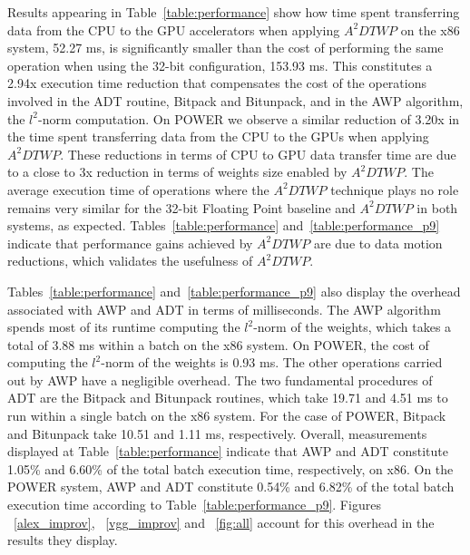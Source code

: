 Results appearing in Table~\ref{table:performance} show how time spent 
transferring data from the CPU to the GPU accelerators when applying $A^2DTWP$ 
on the x86 system, 52.27 ms, is significantly smaller than the cost of 
performing the same operation when using the 32-bit configuration, 153.93 ms.  
This constitutes a 2.94x execution time reduction that compensates the cost of 
the operations involved in the ADT routine, Bitpack and
Bitunpack, and in the AWP algorithm, the $l^2$-norm computation.
On POWER we observe a similar reduction of 3.20x in the time spent transferring
data from the CPU to the GPUs when applying $A^2DTWP$.
These reductions in terms of CPU to GPU data transfer time are due to a close to 
3x reduction in terms of weights size enabled by $A^2DTWP$.
The average execution time of operations where the $A^2DTWP$ technique plays no 
role remains very similar for the 32-bit Floating Point baseline and $A^2DTWP$ 
in both systems, as expected.
Tables~\ref{table:performance} and~\ref{table:performance_p9} indicate that 
performance gains achieved by $A^2DTWP$ are due to data motion reductions, which 
validates the usefulness of $A^2DTWP$.

Tables~\ref{table:performance} and~\ref{table:performance_p9} also display the 
overhead associated with AWP and ADT in terms of milliseconds.
The AWP algorithm spends most of its runtime computing the $l^2$-norm of the 
weights, which takes a total of 3.88 ms within a batch on the x86 system.  On 
POWER, the cost of computing the $l^2$-norm of the weights is 0.93 ms.
The other operations carried out by AWP have a negligible overhead.
The two fundamental procedures of ADT are the Bitpack and Bitunpack routines, 
which take 19.71 and 4.51 ms to run within a single batch on the x86 system.
For the case of POWER, Bitpack and Bitunpack take 10.51 and 1.11 ms, 
respectively.
Overall, measurements displayed at Table~\ref{table:performance} indicate that 
AWP and ADT constitute 1.05\% and 6.60\% of the total batch execution time, 
respectively, on x86.
On the POWER system, AWP and ADT constitute 0.54\% and 6.82\% of the total batch 
execution time according to Table~\ref{table:performance_p9}.  Figures 
~\ref{alex_improv}, ~\ref{vgg_improv} and ~\ref{fig:all} account for this 
overhead in the results they display.

